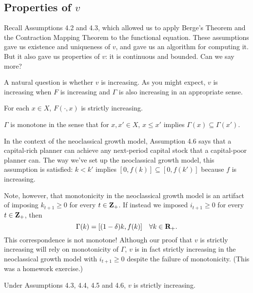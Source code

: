 \documentclass[11pt,letterpaper,reqno,oneside]{article}
\begin{document}
\subsection{Properties of \texorpdfstring{$v$}{v}}
\label{sec:28Sep2015:properties_of_v}

Recall Assumptions 4.2 and 4.3, which allowed us to apply Berge's Theorem and the Contraction Mapping Theorem to the functional equation. These assumptions gave us existence and uniqueness of $v$, and gave us an algorithm for computing it. But it also gave us properties of $v$: it is continuous and bounded. Can we say more?

A natural question is whether $v$ is increasing. As you might expect, $v$ is increasing when $F$ is increasing and $\Gamma$ is also increasing in an appropriate sense.
%
\begin{assumption}
	For each $x \in X$, $F(\cdot,x)$ is strictly increasing.
\end{assumption}

\begin{assumption}
	$\Gamma$ is monotone in the sense that for $x,x' \in X$, $x \leq x'$ implies $\Gamma(x) \subseteq \Gamma(x')$.
\end{assumption}

In the context of the neoclassical growth model, Assumption 4.6 says that a capital-rich planner can achieve any next-period capital stock that a capital-poor planner can. The way we've set up the neoclassical growth model, this assumption is satisfied: $k<k'$ implies $[0,f(k)] \subseteq [0,f(k')]$ because $f$ is increasing.

Note, however, that monotonicity in the neoclassical growth model is an artifact of imposing $k_{t+1} \geq 0$ for every $t \in \mathbf{Z}_+$. If instead we imposed $i_{t+1} \geq 0$ for every $t \in \mathbf{Z}_+$, then
%
\begin{equation*}
	\Gamma(k) = [(1-\delta)k, f(k) ]
	\quad \forall k \in \mathbf{R}_+ .
\end{equation*}
%
This correspondence is not monotone! Although our proof that $v$ is strictly increasing will rely on monotonicity of $\Gamma$, $v$ is in fact strictly increasing in the neoclassical growth model with $i_{t+1} \geq 0$ despite the failure of monotonicity. (This was a homework exercise.)

\begin{theorem}[SLP Th'm 4.7]
	Under Assumptions 4.3, 4.4, 4.5 and 4.6, $v$ is strictly increasing.
\end{theorem}
\end{document}
